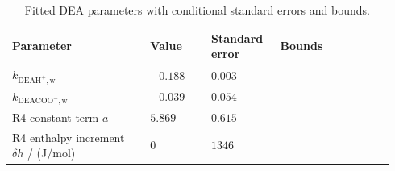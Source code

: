 \begin{table}[htbp]\small\setlength{\tabcolsep}{2pt}\caption{Fitted DEA parameters with conditional standard errors and bounds.}\label{tab:p2-dea-fitted-current}
\begin{tabular}{@{}>{\raggedright\arraybackslash}p{0.34\linewidth}>{\raggedright\arraybackslash}p{0.15\linewidth}>{\raggedright\arraybackslash}p{0.17\linewidth}>{\raggedright\arraybackslash}p{0.28\linewidth}@{}}
\toprule Parameter & Value & Standard error & Bounds \\ \midrule
$k_{\mathrm{DEAH^+,w}}$ & $-0.188$ & $0.003$ & [$-1.000$, $1.000$] \\
$k_{\mathrm{DEACOO^-,w}}$ & $-0.039$ & $0.054$ & [$-1.000$, $1.000$] \\
R4 constant term $a$ & $5.869$ & $0.615$ & [$4.189$, $10.189$] \\
R4 enthalpy increment $\delta h$ / (J/mol) & $0$ & $1346$ & [$-18021$, $21979$] \\
\bottomrule\end{tabular}
\par{}\end{table}
